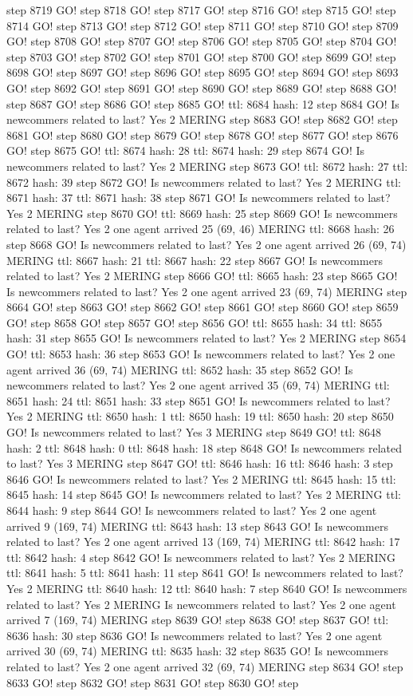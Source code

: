 step 8719 GO! step 8718 GO! step 8717 GO! step 8716 GO! step 8715 GO! step 8714 GO! step 8713 GO! step 8712 GO! step 8711 GO! step 8710 GO! step 8709 GO! step 8708 GO! step 8707 GO! step 8706 GO! step 8705 GO! step 8704 GO! step 8703 GO! step 8702 GO! step 8701 GO! step 8700 GO! step 8699 GO! step 8698 GO! step 8697 GO! step 8696 GO! step 8695 GO! step 8694 GO! step 8693 GO! step 8692 GO! step 8691 GO! step 8690 GO! step 8689 GO! step 8688 GO! step 8687 GO! step 8686 GO! step 8685 GO! ttl: 8684 hash: 12 step 8684 GO! Is newcommers related to last? Yes 2 MERING step 8683 GO! step 8682 GO! step 8681 GO! step 8680 GO! step 8679 GO! step 8678 GO! step 8677 GO! step 8676 GO! step 8675 GO! ttl: 8674 hash: 28 ttl: 8674 hash: 29 step 8674 GO! Is newcommers related to last? Yes 2 MERING step 8673 GO! ttl: 8672 hash: 27 ttl: 8672 hash: 39 step 8672 GO! Is newcommers related to last? Yes 2 MERING ttl: 8671 hash: 37 ttl: 8671 hash: 38 step 8671 GO! Is newcommers related to last? Yes 2 MERING step 8670 GO! ttl: 8669 hash: 25 step 8669 GO! Is newcommers related to last? Yes 2 one agent arrived 25 (69, 46) MERING ttl: 8668 hash: 26 step 8668 GO! Is newcommers related to last? Yes 2 one agent arrived 26 (69, 74) MERING ttl: 8667 hash: 21 ttl: 8667 hash: 22 step 8667 GO! Is newcommers related to last? Yes 2 MERING step 8666 GO! ttl: 8665 hash: 23 step 8665 GO! Is newcommers related to last? Yes 2 one agent arrived 23 (69, 74) MERING step 8664 GO! step 8663 GO! step 8662 GO! step 8661 GO! step 8660 GO! step 8659 GO! step 8658 GO! step 8657 GO! step 8656 GO! ttl: 8655 hash: 34 ttl: 8655 hash: 31 step 8655 GO! Is newcommers related to last? Yes 2 MERING step 8654 GO! ttl: 8653 hash: 36 step 8653 GO! Is newcommers related to last? Yes 2 one agent arrived 36 (69, 74) MERING ttl: 8652 hash: 35 step 8652 GO! Is newcommers related to last? Yes 2 one agent arrived 35 (69, 74) MERING ttl: 8651 hash: 24 ttl: 8651 hash: 33 step 8651 GO! Is newcommers related to last? Yes 2 MERING ttl: 8650 hash: 1 ttl: 8650 hash: 19 ttl: 8650 hash: 20 step 8650 GO! Is newcommers related to last? Yes 3 MERING step 8649 GO! ttl: 8648 hash: 2 ttl: 8648 hash: 0 ttl: 8648 hash: 18 step 8648 GO! Is newcommers related to last? Yes 3 MERING step 8647 GO! ttl: 8646 hash: 16 ttl: 8646 hash: 3 step 8646 GO! Is newcommers related to last? Yes 2 MERING ttl: 8645 hash: 15 ttl: 8645 hash: 14 step 8645 GO! Is newcommers related to last? Yes 2 MERING ttl: 8644 hash: 9 step 8644 GO! Is newcommers related to last? Yes 2 one agent arrived 9 (169, 74) MERING ttl: 8643 hash: 13 step 8643 GO! Is newcommers related to last? Yes 2 one agent arrived 13 (169, 74) MERING ttl: 8642 hash: 17 ttl: 8642 hash: 4 step 8642 GO! Is newcommers related to last? Yes 2 MERING ttl: 8641 hash: 5 ttl: 8641 hash: 11 step 8641 GO! Is newcommers related to last? Yes 2 MERING ttl: 8640 hash: 12 ttl: 8640 hash: 7 step 8640 GO! Is newcommers related to last? Yes 2 MERING Is newcommers related to last? Yes 2 one agent arrived 7 (169, 74) MERING step 8639 GO! step 8638 GO! step 8637 GO! ttl: 8636 hash: 30 step 8636 GO! Is newcommers related to last? Yes 2 one agent arrived 30 (69, 74) MERING ttl: 8635 hash: 32 step 8635 GO! Is newcommers related to last? Yes 2 one agent arrived 32 (69, 74) MERING step 8634 GO! step 8633 GO! step 8632 GO! step 8631 GO! step 8630 GO! step 